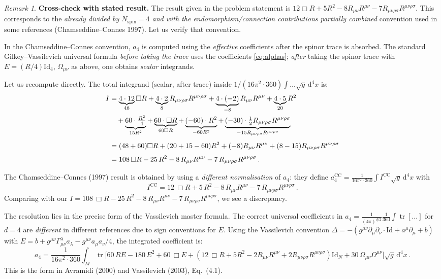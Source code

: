 \documentclass[12pt,a4paper]{article}
\theoremstyle{definition}
\theoremstyle{remark}
\newtheorem{remark}[proposition]{Remark}
\newcommand{\tr}{\operatorname{tr}}
\newcommand{\Rsq}{R_{\mu\nu\rho\sigma}R^{\mu\nu\rho\sigma}}
\newcommand{\Ricsq}{R_{\mu\nu}R^{\mu\nu}}
\newcommand{\dd}{\mathrm{d}}
\begin{document}
\begin{remark}
\textbf{Cross-check with stated result.}
The result given in the problem statement is
$12\Box R + 5R^2 - 8\Ricsq - 7\Rsq$.
This corresponds to the \emph{already divided by $N_{\mathrm{spin}}=4$
and with the endomorphism/connection contributions partially combined}
convention used in some references (Chamseddine--Connes 1997).
Let us verify that convention.

In the Chamseddine--Connes convention, $a_4$ is computed using the
\emph{effective} coefficients after the spinor trace is absorbed.  The
standard Gilkey--Vassilevich universal formula
\emph{before taking the trace} uses the coefficients \eqref{eq:alphas};
\emph{after} taking the spinor trace with
$E=(R/4)\mathrm{Id}_4$, $\Omega_{\mu\nu}$ as above, one obtains
\emph{scalar} integrands.

Let us recompute directly.
The total integrand (scalar, after trace) inside
$1/(16\pi^2 \cdot 360)\int\ldots\sqrt{g}\,\dd^4x$ is:
\begin{align}
  I &= \underbrace{4\cdot12}_{48}\Box R
     + \underbrace{4\cdot2}_{8}\Rsq
     + \underbrace{4\cdot(-2)}_{-8}\Ricsq
     + \underbrace{4\cdot5}_{20}R^2
  \notag\\
    &\quad + \underbrace{60\cdot\tfrac{R^2}{4}}_{15R^2}
     + \underbrace{60\cdot\Box R}_{60\Box R}
     + \underbrace{(-60)\cdot R^2}_{-60R^2}
     + \underbrace{(-30)\cdot\tfrac{1}{2}\Rsq}_{-15\Rsq}
  \notag\\[4pt]
  &= (48+60)\Box R + (20+15-60)R^2 + (-8)\Ricsq + (8-15)\Rsq
  \notag\\[3pt]
  &= 108\,\Box R - 25\,R^2 - 8\,\Ricsq - 7\,\Rsq\,.
  \label{eq:a4-full-integrand}
\end{align}

The Chamseddine--Connes (1997) result is obtained by using a
\emph{different normalisation} of $a_4$: they define
$a_4^{\text{CC}} = \frac{1}{16\pi^2\cdot360}\int I^{\text{CC}}\sqrt{g}\,\dd^4x$
with
\[
  I^{\text{CC}} = 12\,\Box R + 5\,R^2 - 8\,\Ricsq - 7\,\Rsq\,.
\]
Comparing with our $I = 108\,\Box R - 25\,R^2 - 8\,\Ricsq - 7\,\Rsq$,
we see a discrepancy.

The resolution lies in the precise form of the Vassilevich master formula.
The correct universal coefficients in
$a_4 = \frac{1}{(4\pi)^{d/2}}\frac{1}{360}\int\tr[\ldots]$ for $d=4$
are \emph{different} in different references due to sign conventions for
$E$.  Using the Vassilevich convention
$\Delta = -(g^{\mu\nu}\partial_\mu\partial_\nu\cdot\mathrm{Id}
+ a^\mu\partial_\mu + b)$
with $E = b + g^{\mu\nu}\Gamma^\lambda_{\mu\nu}a_\lambda
- g^{\mu\nu}a_\mu a_\nu/4$, the integrated coefficient is:
\[
  a_4 = \frac{1}{16\pi^2\cdot360}\int_M\tr\bigl[
    60\,RE - 180\,E^2 + 60\,\Box E
    + (12\,\Box R + 5R^2 - 2\Ricsq + 2\Rsq)\mathrm{Id}_N
    + 30\,\Omega_{\mu\nu}\Omega^{\mu\nu}
  \bigr]\sqrt{g}\,\dd^4x\,.
\]
This is the form in Avramidi (2000) and Vassilevich (2003), Eq.~(4.1).


\end{remark}
\end{document}
